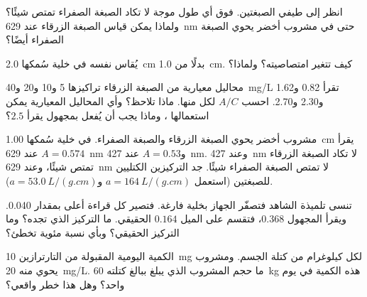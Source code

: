 \begin{exercise}[$\star\star$]\label{exo:g11:absorbance:10}
انظر إلى طيفي الصبغتين. فوق أي طول موجة لا تكاد الصبغة الصفراء تمتص شيئًا؟
ولماذا يمكن قياس الصبغة الزرقاء عند \qty{629}{nm} حتى في مشروب أخضر يحوي
الصبغة الصفراء أيضًا؟
\end{exercise}

\begin{exercise}[$\star\star$]\label{exo:g11:absorbance:11}
يُقاس  نفسه في خلية سُمكها \qty{2.0}{cm} بدلًا من
\qty{1.0}{cm}. كيف تتغير امتصاصيته؟ ولماذا؟
\end{exercise}

\begin{exercise}[$\star\star\star$]\label{exo:g11:absorbance:12}
محاليل معيارية من الصبغة الزرقاء تراكيزها 5 و10 و20 و\qty{40}{mg/L} تقرأ 0.82
و1.62 و2.30 و2.70. احسب $A / C$ لكل منها. ماذا تلاحظ؟ وأي المحاليل المعيارية
يمكن استعمالها ، وماذا يجب أن يُفعل بمجهول يقرأ
$2.5$؟
\end{exercise}

\begin{exercise}[$\star\star\star$]\label{exo:g11:absorbance:13}
مشروب أخضر يحوي الصبغة الزرقاء والصبغة الصفراء. في خلية سُمكها
\qty{1.00}{cm} يقرأ $A = 0.574$ عند \qty{629}{nm} و$A = 0.53$
عند \qty{427}{nm}. وعند \qty{427}{nm} لا تكاد الصبغة الزرقاء تمتص شيئًا،
وعند \qty{629}{nm} لا تمتص الصبغة الصفراء شيئًا. جد التركيزين الكتليين
للصبغتين (استعمل $a = \qty{164}{L/(g.cm)}$
و$a = \qty{53.0}{L/(g.cm)}$).
\end{exercise}

\begin{exercise}[$\star\star\star$]\label{exo:g11:absorbance:14}
تنسى تلميذة الشاهد فتصفّر الجهاز بخلية فارغة. فتصير كل قراءة أعلى بمقدار
\num{0.040}. ويقرأ المجهول $0.368$، فتقسم على الميل $0.164$  الحقيقي. ما التركيز الذي تجده؟ وما التركيز الحقيقي؟ وبأي نسبة مئوية
تخطئ؟
\end{exercise}

\begin{exercise}[$\star\star\star$]\label{exo:g11:absorbance:15}
الكمية اليومية المقبولة من التارترازين \qty{10}{mg} لكل كيلوغرام من كتلة الجسم.
ومشروب يحوي منه \qty{20}{mg/L}. ما حجم المشروب الذي يبلغ ببالغ كتلته
\qty{60}{kg} هذه الكمية في يوم واحد؟ وهل هذا خطر واقعي؟
\end{exercise}

